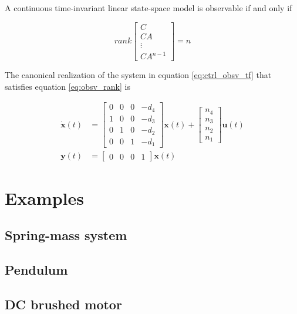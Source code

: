 \documentclass[10pt,conference,compsoc]{IEEEtran}
\newcommand{\mtx}[1] {\bm #1}
\begin{document}
\noindent A continuous time-invariant linear state-space model is observable if
and only if

\begin{equation}
  rank \left[
  \begin{array}{c}
    C \\
    CA \\
    \vdots \\
    CA^{n-1}
  \end{array}
  \right] = n
  \label{eq:obsv_rank}
\end{equation}

\noindent The canonical realization of the system in equation
\ref{eq:ctrl_obsv_tf} that satisfies equation \ref{eq:obsv_rank} is

\begin{align}
  \dot{\mtx{x}}(t) &= \left[
  \begin{array}{cccc}
    0 & 0 & 0 & -d_4 \\
    1 & 0 & 0 & -d_3 \\
    0 & 1 & 0 & -d_2 \\
    0 & 0 & 1 & -d_1
  \end{array}
  \right] \mtx{x}(t) + \left[
  \begin{array}{c}
    n_4 \\
    n_3 \\
    n_2 \\
    n_1
  \end{array}
  \right] \mtx{u}(t) \\
  \mtx{y}(t) &= \left[
  \begin{array}{cccc}
    0 & 0 & 0 & 1
  \end{array}
  \right] \mtx{x}(t)
\end{align}

\section{Examples}

\subsection{Spring-mass system}

\subsection{Pendulum}

\subsection{DC brushed motor}
\end{document}
